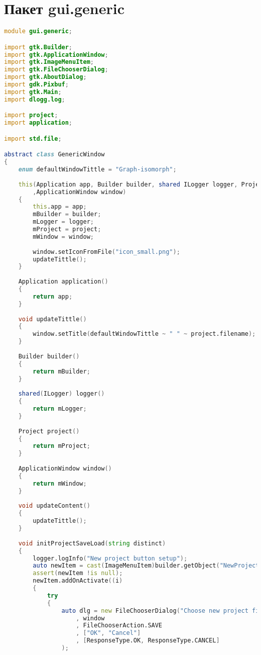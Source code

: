 \documentclass[russian,utf8,emptystyle]{eskdtext}
\begin{document}
\section{Пакет gui.generic}
\begin{lstlisting}[language=D]
module gui.generic;

import gtk.Builder;
import gtk.ApplicationWindow;
import gtk.ImageMenuItem;
import gtk.FileChooserDialog;
import gtk.AboutDialog;
import gdk.Pixbuf;
import gtk.Main;
import dlogg.log;

import project;
import application;

import std.file;

abstract class GenericWindow
{
    enum defaultWindowTittle = "Graph-isomorph";
    
    this(Application app, Builder builder, shared ILogger logger, Project project
        ,ApplicationWindow window)
    {
        this.app = app;
        mBuilder = builder;
        mLogger = logger;
        mProject = project;
        mWindow = window;
        
        window.setIconFromFile("icon_small.png");
        updateTittle();
    }
    
    Application application()
    {
    	return app;
    }
    
    void updateTittle()
    {
        window.setTitle(defaultWindowTittle ~ " " ~ project.filename);
    }
    
    Builder builder()
    {
        return mBuilder;
    }
    
    shared(ILogger) logger()
    {
        return mLogger;
    }
    
    Project project()
    {
        return mProject;
    }
    
    ApplicationWindow window()
    {
        return mWindow;
    }
    
    void updateContent()
    {
        updateTittle();
    }
    
    void initProjectSaveLoad(string distinct)
    {
        logger.logInfo("New project button setup");
        auto newItem = cast(ImageMenuItem)builder.getObject("NewProjectMenuItem"~distinct);
        assert(newItem !is null);
        newItem.addOnActivate((i)
        {
            try
            {
                auto dlg = new FileChooserDialog("Choose new project file"
                    , window
                    , FileChooserAction.SAVE
                    , ["OK", "Cancel"]
                    , [ResponseType.OK, ResponseType.CANCEL]
                );
                

\end{lstlisting}
\end{document}
